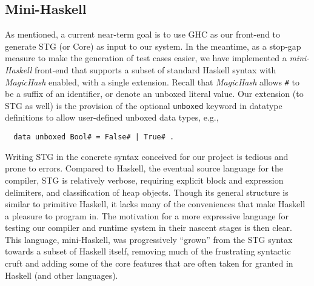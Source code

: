 \documentclass{llncs}
\begin{document}
\begin{comment}
For \emph{direct calls}, in which a known function is applied
to a number of arguments equal to its arity, \emph{stgApply} need not be
invoked: the \emph{FUN} is tail-called directly.


In addition to being in a tail call position, the gcc constraints for
generating a tail call (jump) are (approximately) that the total size of the
caller and callee arguments be equal, and the return type sizes be equal.  For
Clang the requirement is slightly more strict: caller and callee type
signatures must be the same.  These are a consequence of the C calling
convention that the caller, not callee, cleans up the stack (removes the
callee's stack frame).  However, because we maintain our own stack we can
define our own calling convention(s), so tail calls can be made to functions
of notionally differing type.  In particular, top-of-stack frames can be
adjusted in size and content without undue copying.
\end{comment}


\subsection{Mini-Haskell}
As mentioned, a current near-term goal is to use GHC as our front-end to
generate STG (or Core) as input to our system.  In the meantime, as a stop-gap
measure to make the generation of test cases easier, we have implemented a
\emph{mini-Haskell} front-end that supports a subset of standard Haskell
syntax with \emph{MagicHash} enabled, with a single extension.  Recall that
\emph{MagicHash} allows \texttt{\#} to be a suffix of an identifier, or denote
an unboxed literal value.  Our extension (to STG as well) is the provision of
the optional \texttt{unboxed} keyword in datatype definitions to allow
user-defined unboxed data types, e.g.,
\begin{verbatim}
  data unboxed Bool# = False# | True# .
\end{verbatim}

Writing STG in the concrete syntax conceived for our project is tedious and
prone to errors.  Compared to Haskell, the eventual source language for the
compiler, STG is relatively verbose, requiring explicit block and expression
delimiters, and classification of heap objects. Though its general structure
is similar to primitive Haskell, it lacks many of the conveniences that make
Haskell a pleasure to program in.  The motivation for a more expressive
language for testing our compiler and runtime system in their nascent stages
is then clear.  This language, mini-Haskell, was progressively ``grown'' from
the STG syntax towards a subset of Haskell itself, removing much of the
frustrating syntactic cruft and adding some of the core features that are
often taken for granted in Haskell (and other languages).
\end{document}
